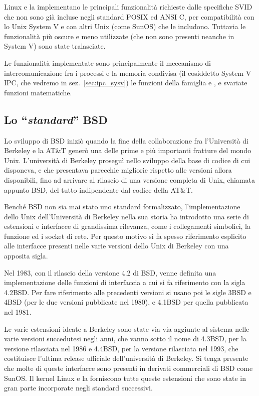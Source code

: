 Linux e la  implementano le principali funzionalità richieste dalle
specifiche SVID che non sono già incluse negli standard POSIX ed ANSI C, per
compatibilità con lo Unix System V e con altri Unix (come SunOS) che le
includono. Tuttavia le funzionalità più oscure e meno utilizzate (che non sono
presenti neanche in System V) sono state tralasciate.

Le funzionalità implementate sono principalmente il meccanismo di
intercomunicazione fra i processi e la memoria condivisa (il cosiddetto System
V IPC, che vedremo in sez.~\ref{sec:ipc_sysv}) le funzioni della famiglia
 e ,  e svariate funzioni
matematiche.


\subsection{Lo ``\textsl{standard}'' BSD}
\label{sec:intro_bsd}

Lo sviluppo di BSD iniziò quando la fine della collaborazione fra l'Università
di Berkeley e la AT\&T generò una delle prime e più importanti fratture del
mondo Unix.  L'università di Berkeley proseguì nello sviluppo della base di
codice di cui disponeva, e che presentava parecchie migliorie rispetto alle
versioni allora disponibili, fino ad arrivare al rilascio di una versione
completa di Unix, chiamata appunto BSD, del tutto indipendente dal codice
della AT\&T.

Benché BSD non sia mai stato uno standard formalizzato, l'implementazione
dello Unix dell'Università di Berkeley nella sua storia ha introdotto una
serie di estensioni e interfacce di grandissima rilevanza, come i collegamenti
simbolici, la funzione  ed i socket di rete. Per questo motivo si
fa spesso riferimento esplicito alle interfacce presenti nelle varie versioni
dello Unix di Berkeley con una apposita sigla.

Nel 1983, con il rilascio della versione 4.2 di BSD, venne definita una
implementazione delle funzioni di interfaccia a cui si fa riferimento con la
sigla 4.2BSD. Per fare riferimento alle precedenti versioni si usano poi le
sigle 3BSD e 4BSD (per le due versioni pubblicate nel 1980), e 4.1BSD per
quella pubblicata nel 1981.

Le varie estensioni ideate a Berkeley sono state via via aggiunte al sistema
nelle varie versioni succedutesi negli anni, che vanno sotto il nome di
4.3BSD, per la versione rilasciata nel 1986 e 4.4BSD, per la versione
rilasciata nel 1993, che costituisce l'ultima release ufficiale
dell'università di Berkeley. Si tenga presente che molte di queste interfacce
sono presenti in derivati commerciali di BSD come SunOS. Il kernel Linux e la
 forniscono tutte queste estensioni che sono state in gran parte
incorporate negli standard successivi.


